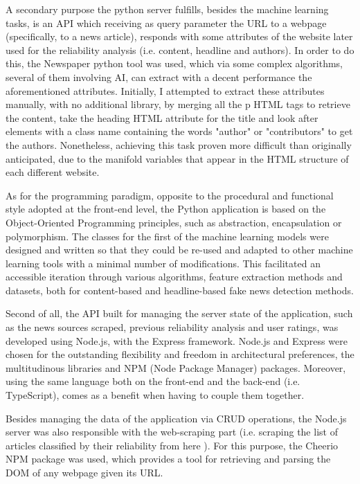   A secondary purpose the python server fulfills, besides the machine learning tasks, is an API which receiving as query parameter the URL to a  webpage (specifically, to a news article), responds with some attributes of the website later used for the reliability analysis (i.e. content, headline and authors). In order to do this, the Newspaper python tool was used, which via some complex algorithms, several of them involving AI, can extract with a decent performance the aforementioned attributes. Initially, I attempted to extract these attributes manually, with no additional library, by merging all the p HTML tags to retrieve the content, take the heading HTML attribute for the title and look after elements with a class name containing the words "author" or "contributors" to get the authors. Nonetheless, achieving this task proven more difficult than originally anticipated, due to the manifold variables that appear in the HTML structure of each different website.

  As for the programming paradigm, opposite to the procedural and functional style adopted at the front-end level, the Python application is based on the Object-Oriented Programming principles, such as abstraction, encapsulation or polymorphism. The classes for the first of the machine learning models were designed and written so that they could be re-used and adapted to other machine learning tools with a minimal number of modifications. This facilitated an accessible iteration through various algorithms, feature extraction methods and datasets, both for content-based and headline-based fake news detection methods.

  Second of all, the API built for managing the server state of the application, such as the news sources scraped, previous reliability analysis and user ratings, was developed using Node.js, with the Express framework. Node.js and Express were chosen for the outstanding flexibility and freedom in architectural preferences, the multitudinous libraries and NPM (Node Package Manager) packages. Moreover, using the same language both on the front-end and the back-end (i.e. TypeScript), comes as a benefit when having to couple them together. 

  Besides managing the data of the application via CRUD operations, the Node.js server was also responsible with the web-scraping part (i.e. scraping the list of articles classified by their reliability from here \cite{wiki_reliable_sources}). For this purpose, the Cheerio NPM package was used, which provides a tool for retrieving and parsing the DOM of any webpage given its URL.

